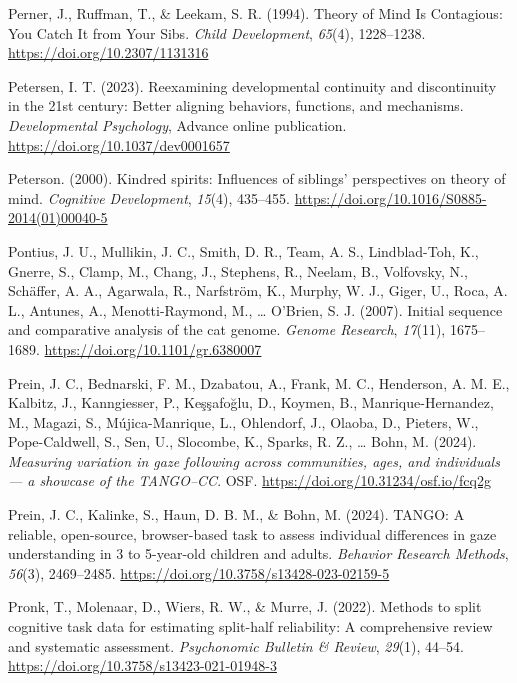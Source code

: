 \documentclass[
]{scrbook}
\newlength{\cslhangindent}
\newenvironment{CSLReferences}[2] %
 {\begin{list}{}{%
  \setlength{\itemindent}{0pt}
  \setlength{\leftmargin}{0pt}
  \setlength{\parsep}{0pt}
  \ifodd #1
   \setlength{\leftmargin}{\cslhangindent}
   \setlength{\itemindent}{-1\cslhangindent}
  \fi
  \setlength{\itemsep}{#2\baselineskip}}}
 {\end{list}}
\begin{document}
\begin{CSLReferences}{1}{0}
Perner, J., Ruffman, T., \& Leekam, S. R. (1994). Theory of {Mind Is Contagious}: {You Catch It} from {Your Sibs}. \emph{Child Development}, \emph{65}(4), 1228--1238. \url{https://doi.org/10.2307/1131316}

Petersen, I. T. (2023). Reexamining developmental continuity and discontinuity in the 21st century: {Better} aligning behaviors, functions, and mechanisms. \emph{Developmental Psychology}, Advance online publication. \url{https://doi.org/10.1037/dev0001657}

Peterson. (2000). Kindred spirits: {Influences} of siblings' perspectives on theory of mind. \emph{Cognitive Development}, \emph{15}(4), 435--455. \url{https://doi.org/10.1016/S0885-2014(01)00040-5}

Pontius, J. U., Mullikin, J. C., Smith, D. R., Team, A. S., Lindblad-Toh, K., Gnerre, S., Clamp, M., Chang, J., Stephens, R., Neelam, B., Volfovsky, N., Schäffer, A. A., Agarwala, R., Narfström, K., Murphy, W. J., Giger, U., Roca, A. L., Antunes, A., Menotti-Raymond, M., \ldots{} O'Brien, S. J. (2007). Initial sequence and comparative analysis of the cat genome. \emph{Genome Research}, \emph{17}(11), 1675--1689. \url{https://doi.org/10.1101/gr.6380007}

Prein, J. C., Bednarski, F. M., Dzabatou, A., Frank, M. C., Henderson, A. M. E., Kalbitz, J., Kanngiesser, P., Keşşafoğlu, D., Koymen, B., Manrique-Hernandez, M., Magazi, S., Mújica-Manrique, L., Ohlendorf, J., Olaoba, D., Pieters, W., Pope-Caldwell, S., Sen, U., Slocombe, K., Sparks, R. Z., \ldots{} Bohn, M. (2024). \emph{Measuring variation in gaze following across communities, ages, and individuals --- a showcase of the {TANGO}--{CC}}. OSF. \url{https://doi.org/10.31234/osf.io/fcq2g}

Prein, J. C., Kalinke, S., Haun, D. B. M., \& Bohn, M. (2024). {TANGO}: {A} reliable, open-source, browser-based task to assess individual differences in gaze understanding in 3 to 5-year-old children and adults. \emph{Behavior Research Methods}, \emph{56}(3), 2469--2485. \url{https://doi.org/10.3758/s13428-023-02159-5}

Pronk, T., Molenaar, D., Wiers, R. W., \& Murre, J. (2022). Methods to split cognitive task data for estimating split-half reliability: {A} comprehensive review and systematic assessment. \emph{Psychonomic Bulletin \& Review}, \emph{29}(1), 44--54. \url{https://doi.org/10.3758/s13423-021-01948-3}


\end{CSLReferences}
\end{document}

